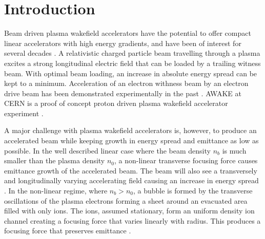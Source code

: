 \documentclass[aps,prstab,reprint,amsmath,amssymb,groupedaddress]{revtex4-1}
\begin{document}
\section{Introduction}\label{S:I}

Beam driven plasma wakefield accelerators have the potential to offer compact linear accelerators with high energy
gradients, and have been of interest for several decades \cite{chen:1985}. A relativistic charged particle beam
travelling through a plasma excites a strong longitudinal electric field that can be loaded by a trailing witness beam.
With optimal beam loading, an increase in absolute energy spread can be kept to a minimum. Acceleration of an electron
withness beam by an electron drive beam has been demonstrated experimentally in the past
\cite{rosenzweig:1988, blumenfeld:2007, kallos:2008}. AWAKE at CERN is a proof of concept proton driven plasma wakefield
accelerator experiment \cite{awake_collaboration:2014}.

A major challenge with plasma wakefield accelerators is, however, to produce an accelerated beam while keeping growth in
energy spread and emittance as low as possible. In the well described linear case where the beam density $n_{b}$ is much
smaller than the plasma density $n_{0}$, a non-linear transverse focusing force causes emittance growth of the
accelerated beam. The beam will also see a transversely and longitudinally varying accelerating field causing an
increase in energy spread \cite{katsouleas:1987}. In the non-linear regime, where $n_{b} > n_{0}$, a bubble is formed by
the transverse oscillations of the plasma electrons forming a sheet around an evacuated area filled with only ions. The
ions, assumed stationary, form an uniform density ion channel creating a focusing force that varies linearly with
radius. This produces a focusing force that preserves emittance \cite{lu:2006-1, lu:2006}.
\end{document}
